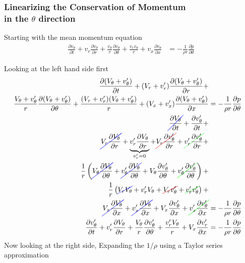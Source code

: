 \subsubsection{Linearizing the Conservation of Momentum\\ in the \textit{$\theta$} direction}
Starting with the mean momentum equation 
\begin{align*}
\frac{\partial v_{\theta}}{\partial t} + 
v_r \frac{\partial v_{\theta}}{\partial r} +
\frac{v_{\theta}  }{r}
\frac{\partial v_{\theta}}{\partial \theta}+
\frac{v_r v_{\theta}}{r}+ 
v_x \frac{\partial v_{\theta}}{\partial x} 
&= -\frac{1}{\rho r} 
\frac{\partial p}{\partial \theta}
\end{align*}

Looking at the left hand side first
\begin{align*} 
\frac{\partial (V_{\theta} + v_{\theta}') }{\partial t} + 
( V_r + v_r' ) 
\frac{\partial( V_{\theta} + v_{\theta}')}{\partial r} + \\
\frac{V_{\theta} + v_{\theta}'}{r}
\frac{\partial(V_{\theta} + v_{\theta}')}{\partial \theta} +
\frac{ (V_r + v_r')(V_{\theta} + v_{\theta}')}{ r} + 
(V_x + v_x') 
\frac{\partial (V_{\theta} + v_{\theta}')}{\partial x} 	
&= 
-\frac{1}{\rho r} \frac{\partial p}{\partial \theta}\\
\Ccancel[blue]  {\frac{\partial  V_{\theta}  }{\partial t}}	+
\frac{\partial  v_{\theta}' }{\partial t} + \\
\Ccancel[blue]  {V_r  \frac{\partial  V_{\theta}  }{\partial r}}  +
\underbrace{v_r' \frac{\partial  V_{\theta}  }{\partial r}}_{v_r'=0} + 
\Ccancel[red]{V_r  \frac{\partial  v_{\theta}' }{\partial r}} + 
\Ccancel[green]{v_r' \frac{\partial  v_{\theta}' }{\partial r}} +\\
\frac{1}{r}
\left(
\Ccancel[blue]  {V_{\theta} \frac{\partial V_{\theta}}{\partial \theta}} +
\Ccancel[blue] {v_{\theta}'\frac{\partial V_{\theta}}{\partial \theta}} +
V_{\theta} \frac{\partial v'_{\theta}}{\partial \theta} +
\Ccancel[green]{v_{\theta}'\frac{\partial v'_{\theta}}{\partial \theta}}
\right)+ \\
\frac{1}{r}\left(
\Ccancel[blue]{V_r V_{\theta}} + 
v_r'V_{\theta} +
\Ccancel[red]{V_r v'_{\theta}}  + 	
\Ccancel[green]{v_r'v_{\theta}'}\right)+\\
\Ccancel[blue]{V_x \frac{\partial V_{\theta} }{\partial x}} +
\Ccancel[blue]{v_x'\frac{\partial V_{\theta} }{\partial x}} +  
V_x \frac{\partial v_{\theta}'}{\partial x} +
\Ccancel[green]{v_x' \frac{\partial v_{\theta}'}{\partial x}} 
&= -\frac{1}{\rho r} 
\frac{\partial p}{\partial \theta}\\
\frac{\partial  v_{\theta}' }{\partial t} +
v_r' \frac{\partial  V_{\theta}  }{\partial r} +
\frac{V_{\theta}}{r} \frac{\partial v'_{\theta}}{\partial \theta} +
\frac{v'_rV_{\theta}}{r} +
V_x \frac{\partial v_r'}{\partial x} 
&= -\frac{1}{\rho r} 
\frac{\partial p}{\partial \theta}
\end{align*}
Now looking at the right side,
Expanding the $1/\rho $ using a Taylor series approximation


